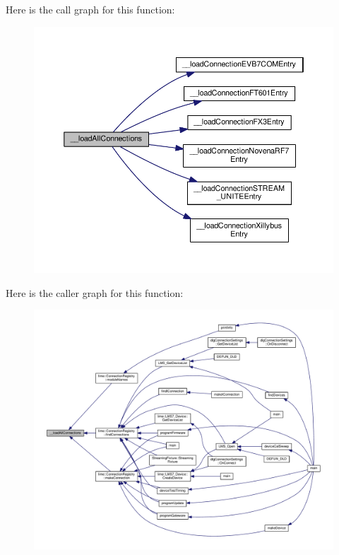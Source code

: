 Here is the call graph for this function\+:
\nopagebreak
\begin{figure}[H]
\begin{center}
\leavevmode
\includegraphics[width=350pt]{d6/d7b/BuiltinConnections_8in_8cpp_aa70d3b52e1cb50a0736b9cf791464ee1_cgraph}
\end{center}
\end{figure}




Here is the caller graph for this function\+:
\nopagebreak
\begin{figure}[H]
\begin{center}
\leavevmode
\includegraphics[width=350pt]{d6/d7b/BuiltinConnections_8in_8cpp_aa70d3b52e1cb50a0736b9cf791464ee1_icgraph}
\end{center}
\end{figure}


